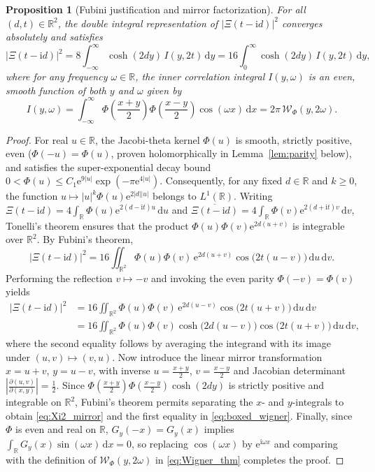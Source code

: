 \documentclass[11pt,a4paper,reqno]{amsart}
\newtheorem{proposition}[theorem]{Proposition}
\theoremstyle{definition}
\theoremstyle{remark}
\numberwithin{equation}{section}
\newcommand{\dd}{\mathrm{d}}
\newcommand{\ii}{\mathrm{i}}
\newcommand{\ee}{\mathrm{e}}
\newcommand{\Wig}{\mathcal{W}}
\begin{document}
\begin{proposition}[Fubini justification and mirror factorization]\label{prop:mirror}
For all $(d,t) \in \mathbb{R}^2$, the double integral representation of $|\Xi(t-\ii d)|^2$ converges absolutely and satisfies
\begin{equation}\label{eq:Xi2_mirror}
\big|\Xi(t-\ii d)\big|^2 = 8\int_{-\infty}^\infty \cosh(2d y)\,I(y,2t)\,\dd y = 16\int_0^\infty \cosh(2d y)\,I(y,2t)\,\dd y,
\end{equation}
where for any frequency $\omega \in \mathbb{R}$, the inner correlation integral $I(y,\omega)$ is an even, smooth function of both $y$ and $\omega$ given by
\begin{equation}\label{eq:boxed_wigner}
\boxed{I(y,\omega) = \int_{-\infty}^\infty \Phi\!\left(\frac{x+y}{2}\right)\Phi\!\left(\frac{x-y}{2}\right)\cos(\omega x)\,\dd x = 2\pi\,\Wig_\Phi(y, 2\omega).}
\end{equation}
\end{proposition}

\begin{proof}
For real $u \in \mathbb{R}$, the Jacobi-theta kernel $\Phi(u)$ is smooth, strictly positive, even ($\Phi(-u) = \Phi(u)$, proven holomorphically in Lemma~\ref{lem:parity} below), and satisfies the super-exponential decay bound $0 < \Phi(u) \le C_1 \ee^{9|u|}\exp(-\pi\ee^{4|u|})$. Consequently, for any fixed $d \in \mathbb{R}$ and $k \ge 0$, the function $u \mapsto |u|^k \Phi(u)\ee^{2|d||u|}$ belongs to $L^1(\mathbb{R})$. Writing $\Xi(t-\ii d) = 4\int_{\mathbb{R}} \Phi(u)\ee^{2(d - \ii t)u}\,\dd u$ and $\overline{\Xi(t-\ii d)} = 4\int_{\mathbb{R}} \Phi(v)\ee^{2(d + \ii t)v}\,\dd v$, Tonelli's theorem ensures that the product $\Phi(u)\Phi(v)\ee^{2d(u+v)}$ is integrable over $\mathbb{R}^2$. By Fubini's theorem,
\[
\big|\Xi(t-\ii d)\big|^2 = 16\iint_{\mathbb{R}^2} \Phi(u)\Phi(v)\,\ee^{2d(u+v)}\cos\!\big(2t(u-v)\big)\,\dd u\,\dd v.
\]
Performing the reflection $v \mapsto -v$ and invoking the even parity $\Phi(-v) = \Phi(v)$ yields
\[
\begin{aligned}
\big|\Xi(t-\ii d)\big|^2 &= 16\iint_{\mathbb{R}^2} \Phi(u)\Phi(v)\,\ee^{2d(u-v)}\cos\!\big(2t(u+v)\big)\,\dd u\,\dd v \\
&= 16\iint_{\mathbb{R}^2} \Phi(u)\Phi(v)\cosh\!\big(2d(u-v)\big)\cos\!\big(2t(u+v)\big)\,\dd u\,\dd v,
\end{aligned}
\]
where the second equality follows by averaging the integrand with its image under $(u,v) \mapsto (v,u)$. Now introduce the linear mirror transformation $x = u + v$, $y = u - v$, with inverse $u = \frac{x+y}{2}$, $v = \frac{x-y}{2}$ and Jacobian determinant $|\frac{\partial(u,v)}{\partial(x,y)}| = \frac{1}{2}$. Since $\Phi(\frac{x+y}{2})\Phi(\frac{x-y}{2})\cosh(2d y)$ is strictly positive and integrable on $\mathbb{R}^2$, Fubini's theorem permits separating the $x$- and $y$-integrals to obtain \eqref{eq:Xi2_mirror} and the first equality in \eqref{eq:boxed_wigner}. Finally, since $\Phi$ is even and real on $\mathbb{R}$, $G_y(-x) = G_y(x)$ implies $\int_{\mathbb{R}} G_y(x)\sin(\omega x)\,\dd x = 0$, so replacing $\cos(\omega x)$ by $\ee^{\ii \omega x}$ and comparing with the definition of $\Wig_\Phi(y,2\omega)$ in \eqref{eq:Wigner_thm} completes the proof.
\end{proof}
\end{document}
